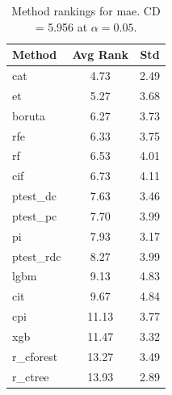 \begin{table}[h]
\centering
\caption{Method rankings for mae. CD = 5.956 at $\alpha=0.05$.}
\label{tab:ranks_mae}
\begin{tabular}{lcc}
\toprule
Method & Avg Rank & Std \\
\midrule
cat & 4.73 & 2.49 \\
et & 5.27 & 3.68 \\
boruta & 6.27 & 3.73 \\
rfe & 6.33 & 3.75 \\
rf & 6.53 & 4.01 \\
cif & 6.73 & 4.11 \\
ptest_dc & 7.63 & 3.46 \\
ptest_pc & 7.70 & 3.99 \\
pi & 7.93 & 3.17 \\
ptest_rdc & 8.27 & 3.99 \\
lgbm & 9.13 & 4.83 \\
cit & 9.67 & 4.84 \\
cpi & 11.13 & 3.77 \\
xgb & 11.47 & 3.32 \\
r_cforest & 13.27 & 3.49 \\
r_ctree & 13.93 & 2.89 \\
\bottomrule
\end{tabular}
\end{table}